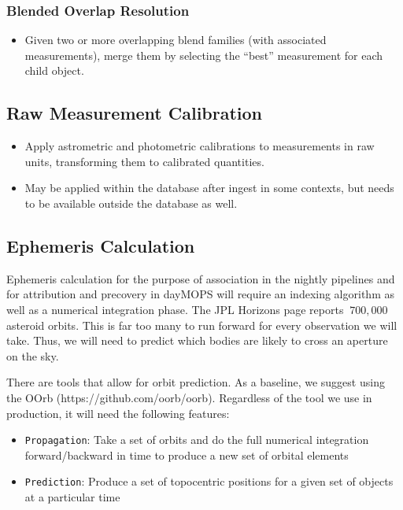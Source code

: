 \subsubsection{Blended Overlap Resolution}
\label{sec:acBlendedOverlapResolution}
\begin{itemize}
\item Given two or more overlapping blend families (with associated measurements), merge them by selecting the ``best'' measurement for each child object.
\end{itemize}

\subsection{Raw Measurement Calibration}
\label{sec:acRawMeasurementCalibration}

\begin{itemize}
\item Apply astrometric and photometric calibrations to measurements in raw units, transforming them to calibrated quantities.
\item May be applied within the database after ingest in some contexts, but needs to be available outside the database as well.
\end{itemize}


\subsection{Ephemeris Calculation}
\label{sec:acEphemerisCalculation}
Ephemeris calculation for the purpose of association in the nightly pipelines and for attribution and precovery in dayMOPS will require an indexing algorithm as well as a numerical integration phase. The JPL Horizons page reports $~700,000$ asteroid orbits.  This is far too many to run forward for every observation we will take.  Thus, we will need to predict which bodies are likely to cross an aperture on the sky.  

There are tools that allow for orbit prediction.  As a baseline, we suggest using the OOrb (https://github.com/oorb/oorb).  Regardless of the tool we use in production, it will need the following features:
\begin{itemize}
\item {\tt Propagation}: Take a set of orbits and do the full numerical integration forward/backward in time to produce a new set of orbital elements
\item {\tt Prediction}: Produce a set of topocentric positions for a given set of objects at a particular time
\end{itemize}

